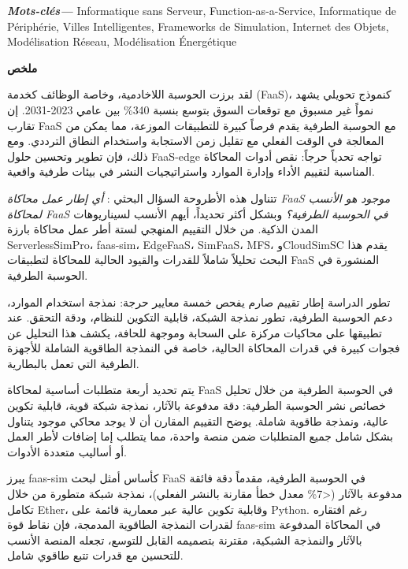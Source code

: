 \providecommand{\keywordsfr}[1] {
  \small
  \textbf{\textit{Mots-clés---}} #1
}
\keywordsfr{Informatique sans Serveur, Function-as-a-Service, Informatique de Périphérie, Villes Intelligentes, Frameworks de Simulation, Internet des Objets, Modélisation Réseau, Modélisation Énergétique}

\newpage
{}
\vspace*{4cm}
\begin{center}
    {\Large\bf ملخص}
\end{center} \vskip 0.5cm

لقد برزت الحوسبة اللاخادمية، وخاصة الوظائف كخدمة (FaaS)، كنموذج تحويلي يشهد نمواً غير مسبوق مع توقعات السوق بتوسع بنسبة 340\% بين عامي 2023-2031. إن تقارب FaaS مع الحوسبة الطرفية يقدم فرصاً كبيرة للتطبيقات الموزعة، مما يمكن من المعالجة في الوقت الفعلي مع تقليل زمن الاستجابة واستخدام النطاق الترددي. ومع ذلك، فإن تطوير وتحسين حلول FaaS-edge تواجه تحدياً حرجاً: نقص أدوات المحاكاة المناسبة لتقييم الأداء وإدارة الموارد واستراتيجيات النشر في بيئات طرفية واقعية.

تتناول هذه الأطروحة السؤال البحثي : \textit{أي إطار عمل محاكاة FaaS موجود هو الأنسب لمحاكاة FaaS في الحوسبة الطرفية؟} وبشكل أكثر تحديداً، أيهم الأنسب لسيناريوهات المدن الذكية. من خلال التقييم المنهجي لستة أطر عمل محاكاة بارزة ServerlessSimPro، faas-sim، EdgeFaaS، SimFaaS، MFS، وCloudSimSC يقدم هذا البحث تحليلاً شاملاً للقدرات والقيود الحالية للمحاكاة لتطبيقات FaaS المنشورة في الحوسبة الطرفية.

تطور الدراسة إطار تقييم صارم يفحص خمسة معايير حرجة: نمذجة استخدام الموارد، دعم الحوسبة الطرفية، تطور نمذجة الشبكة، قابلية التكوين للنظام، ودقة التحقق. عند تطبيقها على محاكيات مركزة على السحابة وموجهة للحافة، يكشف هذا التحليل عن فجوات كبيرة في قدرات المحاكاة الحالية، خاصة في النمذجة الطاقوية الشاملة للأجهزة الطرفية التي تعمل بالبطارية.

يتم تحديد أربعة متطلبات أساسية لمحاكاة FaaS في الحوسبة الطرفية من خلال تحليل خصائص نشر الحوسبة الطرفية: دقة مدفوعة بالآثار، نمذجة شبكة قوية، قابلية تكوين عالية، ونمذجة طاقوية شاملة. يوضح التقييم المقارن أن لا يوجد محاكي موجود يتناول بشكل شامل جميع المتطلبات ضمن منصة واحدة، مما يتطلب إما إضافات لأطر العمل أو أساليب متعددة الأدوات.

يبرز faas-sim كأساس أمثل لبحث FaaS في الحوسبة الطرفية، مقدماً دقة فائقة مدفوعة بالآثار (<7\% معدل خطأ مقارنة بالنشر الفعلي)، نمذجة شبكة متطورة من خلال تكامل Ether، وقابلية تكوين عالية عبر معمارية قائمة على Python. رغم افتقاره لقدرات النمذجة الطاقوية المدمجة، فإن نقاط قوة faas-sim في المحاكاة المدفوعة بالآثار والنمذجة الشبكية، مقترنة بتصميمه القابل للتوسع، تجعله المنصة الأنسب للتحسين مع قدرات تتبع طاقوي شامل.


